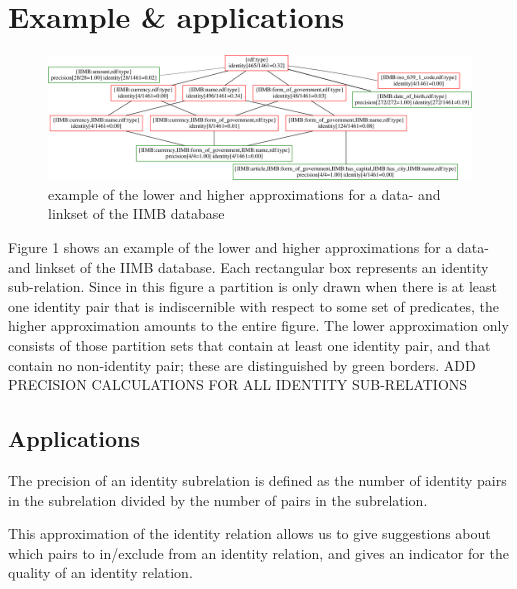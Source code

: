 \section{Example \& applications}

\begin{figure}
\label{fig:ihierarchy}
\centering
\includegraphics[width=\textwidth]{./img/iimb_16}
\caption{example of the lower and higher   approximations for a data- and linkset of the IIMB database}
\end{figure}

Figure 1 shows an example of the lower and higher
  approximations for a data- and linkset of the IIMB database.
Each rectangular box represents an identity sub-relation.
Since in this figure a partition is only drawn when there is at least one
  identity pair that is indiscernible with respect to some set of
  predicates, the higher approximation amounts to the entire figure.
The lower approximation only consists of those partition sets that contain
  at least one identity pair, and that contain no non-identity pair;
  these are distinguished by green borders.
ADD PRECISION CALCULATIONS FOR ALL IDENTITY SUB-RELATIONS

\subsection{Applications}

The precision of an identity subrelation is defined as
    the number of identity pairs in the subrelation
  divided by
    the number of pairs in the subrelation.

This approximation of the identity relation allows us to
  give suggestions about which pairs to in/exclude from
  an identity relation, and
  gives an indicator for the quality of an identity relation.

